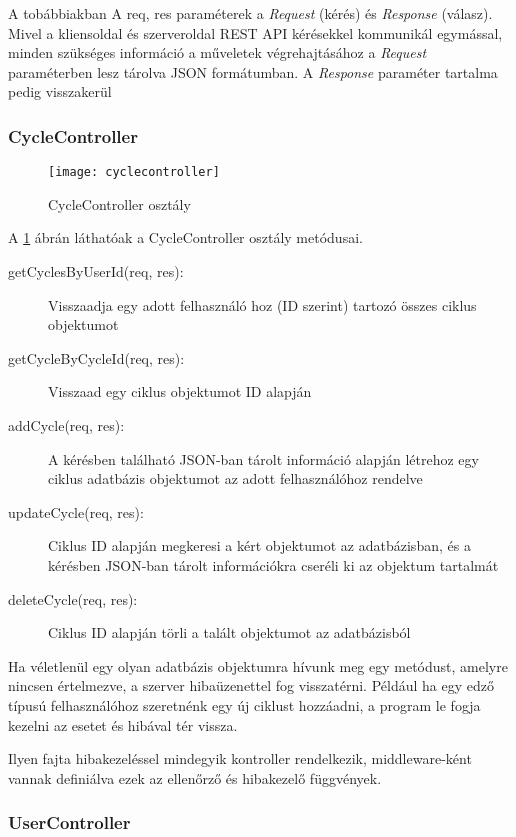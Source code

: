 A tobábbiakban A req, res paraméterek a \emph{Request} (kérés) és \emph{Response} (válasz). Mivel a kliensoldal és szerveroldal REST API kérésekkel kommunikál egymással, minden szükséges információ a műveletek végrehajtásához a \emph{Request} paraméterben lesz tárolva JSON formátumban. A \emph{Response} paraméter tartalma pedig visszakerül 

\subsubsection{CycleController}

\begin{figure}[H]
	\centering
	\texttt{[image: cyclecontroller]}
	\caption{CycleController osztály}
	\label{fig:cyclecontroller}
\end{figure}

A \ref{fig:cyclecontroller} ábrán láthatóak a CycleController osztály metódusai.

\begin{description}
	\item[getCyclesByUserId(req, res):] Visszaadja egy adott felhasználó hoz (ID szerint) tartozó összes ciklus objektumot
	\item[getCycleByCycleId(req, res):] Visszaad egy ciklus objektumot ID alapján
	\item[addCycle(req, res):] A kérésben található JSON-ban tárolt információ alapján létrehoz egy ciklus adatbázis objektumot az adott felhasználóhoz rendelve
	\item[updateCycle(req, res):] Ciklus ID alapján megkeresi a kért objektumot az adatbázisban, és a kérésben JSON-ban tárolt információkra cseréli ki az objektum tartalmát
	\item[deleteCycle(req, res):] Ciklus ID alapján törli a talált objektumot az adatbázisból  
\end{description}

Ha véletlenül egy olyan adatbázis objektumra hívunk meg egy metódust, amelyre nincsen értelmezve, a szerver hibaüzenettel fog visszatérni. Például ha egy edző típusú felhasználóhoz szeretnénk egy új ciklust hozzáadni, a program le fogja kezelni az esetet és hibával tér vissza. 

Ilyen fajta hibakezeléssel mindegyik kontroller rendelkezik, middleware-ként vannak definiálva ezek az ellenőrző és hibakezelő függvények.

\subsubsection{UserController}

